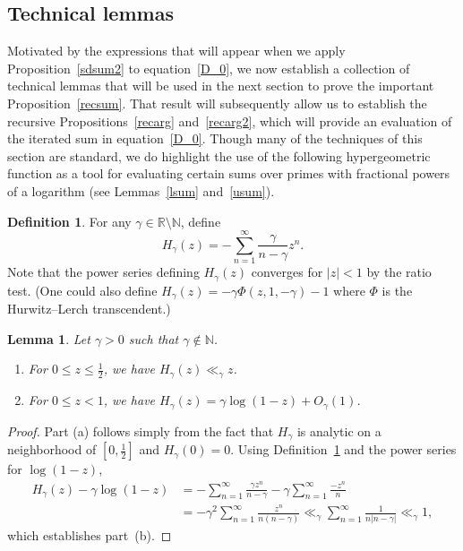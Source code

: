 \documentclass[12pt,reqno]{amsart}
\newtheorem{lemma}[theorem]{Lemma}
\theoremstyle{definition}
\newtheorem{definition}[theorem]{Definition}
\newcommand{\N}{{\mathbb N}}
\newcommand{\R}{{\mathbb R}}
\begin{document}
\subsection{Technical lemmas}

Motivated by the expressions that will appear when we apply Proposition~\ref{sdsum2} to equation~\eqref{D_0}, we now establish a collection of technical lemmas that will be used in the next section to prove the important Proposition~\ref{recsum}. That result will subsequently allow us to establish the recursive Propositions~\ref{recarg} and~\ref{recarg2}, which will provide an evaluation of the iterated sum in equation~\eqref{D_0}. Though many of the techniques of this section are standard, we do highlight the use of the following hypergeometric function as a tool for evaluating certain sums over primes with fractional powers of a logarithm (see Lemmas~\ref{lsum} and~\ref{usum}).

\begin{definition} \label{H def}
For any $\gamma\in\R\setminus\N$, define
\[
H_\gamma(z) = -\sum_{n=1}^\infty \frac \gamma{n-\gamma}z^n.
\]
Note that the power series defining $H_\gamma (z)$ converges for $|z|<1$ by the ratio test. (One could also define $H_\gamma(z) = -\gamma\Phi(z,1,-\gamma)-1$ where $\Phi$ is the Hurwitz--Lerch transcendent.)
\end{definition}

\begin{lemma} \label{lint lemma}
Let $\gamma>0$ such that $\gamma\not\in\N$.
\begin{enumerate}
\item For $0\le z\le\frac12$, we have $H_\gamma(z) \ll_\gamma z$.
\item For $0\le z<1$, we have $H_\gamma(z) = \gamma\log(1-z) + O_\gamma(1)$.
\end{enumerate}
\end{lemma}

\begin{proof}
Part (a) follows simply from the fact that $H_\gamma$ is analytic on a neighborhood of $[0,\frac12]$ and $H_\gamma(0)=0$.
Using Definition~\ref{H def} and the power series for $\log(1-z)$,
\begin{align*}
H_\gamma(z)-\gamma\log(1-z)&=-\sum_{n=1}^{\infty} \frac{\gamma z^n}{n-\gamma} - \gamma\sum_{n=1}^\infty \frac{-z^n}n \\
&= -\gamma^2\sum_{n=1}^\infty \frac{z^n}{n(n-\gamma)} \ll_\gamma \sum_{n=1}^\infty \frac{1}{n|n-\gamma|} \ll_\gamma 1,
\end{align*}
which establishes part~(b).
\end{proof}
\end{document}
